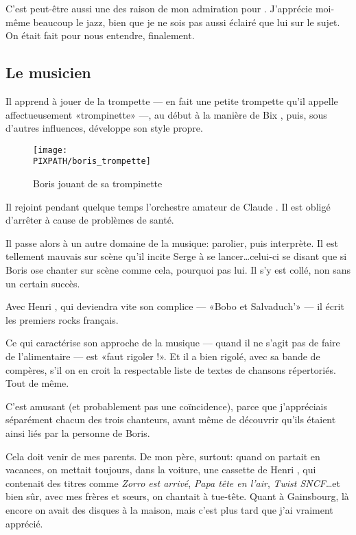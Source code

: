C'est peut-être aussi une des raison de mon admiration pour \BV. J'apprécie moi-même beaucoup
le jazz, bien que je ne sois pas aussi éclairé que lui sur le sujet.
 On était fait pour nous entendre, finalement.


\subsection{Le musicien}

Il apprend à jouer de la trompette --- en fait une petite trompette
qu'il appelle affectueusement «trompinette» ---,
au début à la manière de Bix , puis, sous d'autres influences, développe
son style propre.

\begin{figure}
\centering
\texttt{[image: \\PIXPATH/boris\_trompette]}
\caption{Boris jouant de sa trompinette}
\end{figure}

Il rejoint pendant quelque temps l'orchestre amateur
de Claude . Il est obligé d'arrêter à cause
de problèmes de santé.

Il passe alors à un autre domaine de la musique: parolier, puis interprète. Il est tellement
mauvais sur scène qu'il incite Serge   à se lancer\ldots celui-ci se disant
que si Boris ose chanter sur scène comme cela, pourquoi pas lui. Il s'y est collé, non sans
un certain succès.

Avec Henri , qui deviendra vite son complice --- «Bobo et Salvaduch'» --- il
écrit les premiers rocks français.

Ce qui caractérise son approche de la musique --- quand il ne s'agit pas de faire de
l'alimentaire --- est «faut rigoler !». Et il a bien rigolé, avec sa bande
de compères, s'il on en croit la respectable liste de  textes de chansons
répertoriés. Tout de même. 


C'est amusant (et probablement pas une coïncidence), parce que j'appréciais séparément
chacun des trois chanteurs, avant même de découvrir qu'ils étaient ainsi liés par
la personne de Boris.

Cela doit venir de mes parents. De mon père, surtout: quand on partait en vacances,
on mettait toujours, dans la voiture, une cassette de Henri , qui
contenait des titres comme \emph{Zorro est arrivé}, \emph{Papa tête en l'air},
\emph{Twist SNCF}\ldots et bien sûr, avec mes frères et s\oe{}urs, on chantait
à tue-tête.
Quant à Gainsbourg, là encore on avait des disques à la maison, mais c'est plus
tard que j'ai vraiment apprécié.

